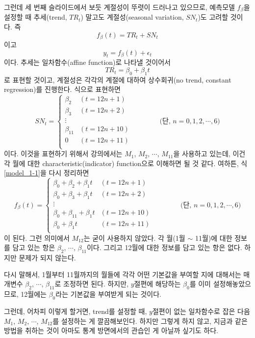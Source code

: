 \documentclass{article}
\begin{document}
그런데 세 번째 슬라이드에서 보듯 계절성이 뚜렷이 드러나고 있으므로, 예측모델 \(f_\beta\)을 설정할 때 추세(trend, $TR_t$) 말고도 계절성(seasonal variation, $SN_t$)도 고려할 것이다.
즉
\begin{equation}\label{model_1-1}
f_\beta(t) = TR_t+SN_t
\end{equation}
이고
\[y_t=f_\beta(t)+\epsilon_t\]
이다.
추세는 일차함수(affine function)로 나타낼 것이어서
\[TR_t = \beta_0+\beta_1 t\]
로 표현할 것이고, 계절성은 각각의 계절에 대하여 상수회귀(no trend, constant regression)를 진행한다.
식으로 표현하면
\[SN_t = \begin{cases}
\beta_2&(t=12n+1)\\
\beta_3&(t=12n+2)\\
\vdots\\
\beta_{11}&(t=12n+10)\\
0&(t=12n+11)\\
\end{cases}\qquad\qquad(\text{단, \(n=0,1,2,\cdots,6)\)}\]
이다.
이것을 표현하기 위해서 강의에서는 \(M_1\), \(M_2\), \(\cdots\), \(M_{11}\)을 사용하고 있는데, 이건 각 월에 대한 characteristic(indicator) function으로 이해하면 될 것 같다.
여하튼, 식 \eqref{model_1-1}을 다시 정리하면
\begin{equation}\label{model_1-2}
f_\beta(t) = \begin{cases}
\beta_0+\beta_2+\beta_1t&(t=12n+1)\\
\beta_0+\beta_3+\beta_1t&(t=12n+2)\\
\vdots\\
\beta_0+\beta_{11}+\beta_1t&(t=12n+10)\\
\beta_0+\beta_1t&(t=12n+11)\\
\end{cases}\qquad\qquad(\text{단, \(n=0,1,2,\cdots,6)\)}
\end{equation}
이 된다.
그런 의미에서 \(M_{12}\)는 굳이 사용하지 않았다.
각 월(1월 \(\sim\) 11월)에 대한 정보를 담고 있는 항은 \(\beta_2\), \(\cdots\), \(\beta_{11}\)이다.
그리고 12월에 대한 정보를 담고 있는 항은 없다.
하지만 문제가 되지 않는다.

다시 말해서, 1월부터 11월까지의 월들에 각각 어떤 기본값을 부여할 지에 대해서는 매개변수 \(\beta_2\), \(\cdots\), \(\beta_{11}\)로 조정하면 된다.
하지만, \(y\)절편에 해당하는 \(\beta_0\)를 이미 설정해놓았으므로, 12월에는 \(\beta_0\)라는 기본값을 부여받게 되는 것이다.

그런데, 어차피 이렇게 할거면, trend를 설정할 때, \(y\)절편이 없는 일차함수로 잡은 다음 \(M_1\), \(M_2\), \(\cdots\), \(M_{12}\)를 설정하는 게 깔끔해보인다.
하지만 그렇게 하지 않고, 지금과 같은 방법을 취하는 것이 아마도 통계 방면에서의 관습인 게 아닐까 싶기도 하다.
\end{document}
